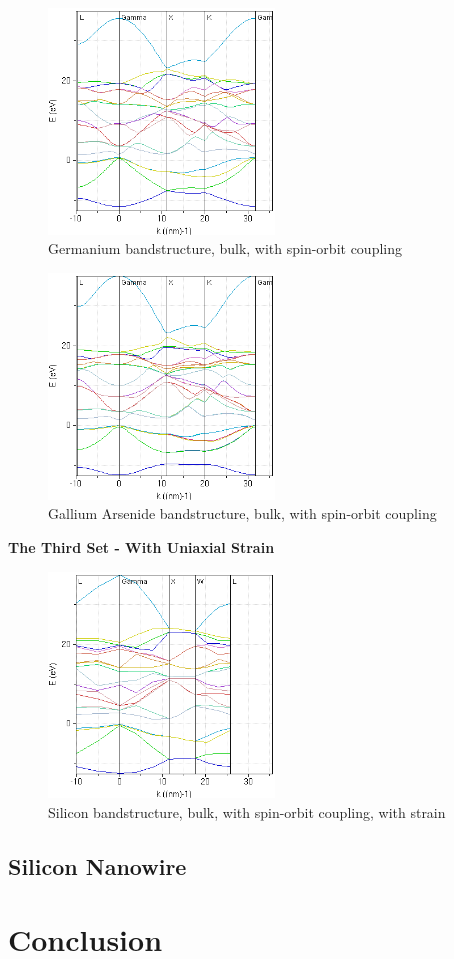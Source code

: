 \documentclass{IEEEtran}
\begin{document}
\begin{figure}[!ht] 
    \centering
    \includegraphics*[width = 6cm]{ge-bands-secondset.png}
    \caption{Germanium bandstructure, bulk, with spin-orbit coupling}
    \label{fig:ge-second-set}
\end{figure}    

\begin{figure}[!ht] 
    \centering
    \includegraphics*[width = 6cm]{gaas-bands-secondset.png}
    \caption{Gallium Arsenide bandstructure, bulk, with spin-orbit coupling}
    \label{fig:gaas-second-set}
\end{figure}    

\bigskip

\textbf{The Third Set - With Uniaxial Strain}

\begin{figure}[!ht] 
    \centering
    \includegraphics*[width = 6cm]{si-bands-thirdset.png}
    \caption{Silicon bandstructure, bulk, with spin-orbit coupling, with strain}
    \label{fig:si-third-set}
\end{figure}    

\subsection{Silicon Nanowire}

\section{Conclusion}



\end{document}
